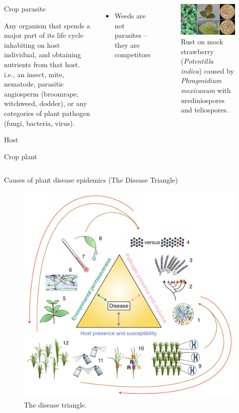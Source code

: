 \documentclass[11pt,dvipsnames,ignorenonframetext,aspectratio=169]{beamer}
\providecommand{\tightlist}{%
  \setlength{\itemsep}{0pt}\setlength{\parskip}{0pt}}
\newcommand{\bcolumns}{\begin{columns}[T, onlytextwidth]}
\newcommand{\ecolumns}{\end{columns}}
\newcommand{\bdescription}{\begin{description}}
\newcommand{\edescription}{\end{description}}
\begin{document}
\begin{frame}{}
\protect\hypertarget{section-7}{}
\bcolumns
{}
\bdescription
\footnotesize
\item[Crop parasite]

Any organism that spends a major part of its life cycle inhabiting on
host individual, and obtaining nutrients from that host. i.e., an
insect, mite, nematode, parasitic angiosperm (broomrape, witchweed,
dodder), or any categories of plant pathogen (fungi, bacteria, virus).

\item[Host]

Crop plant \edescription

\begin{itemize}
\tightlist
\item
  Weeds are not parasites -- they are competitors
\end{itemize}


\begin{figure}
\includegraphics[width=0.92\linewidth]{../images/FCpHrYNWEAIhiv9} \caption{Rust on mock strawberry (\textit{Potentilla indica}) caused by \textit{Phragmidium mexicanum} with urediniospores and teliospores.}\label{fig:strawberry-rust}
\end{figure}

\ecolumns
\end{frame}

\begin{frame}{Causes of plant disease epidemics (The Disease Triangle)}
\protect\hypertarget{causes-of-plant-disease-epidemics-the-disease-triangle}{}
\begin{figure}
\includegraphics[width=0.45\linewidth]{../images/disease_triangle} \caption{The disease triangle.}\label{fig:disease-triangle}
\end{figure}
\end{frame}
\end{document}
